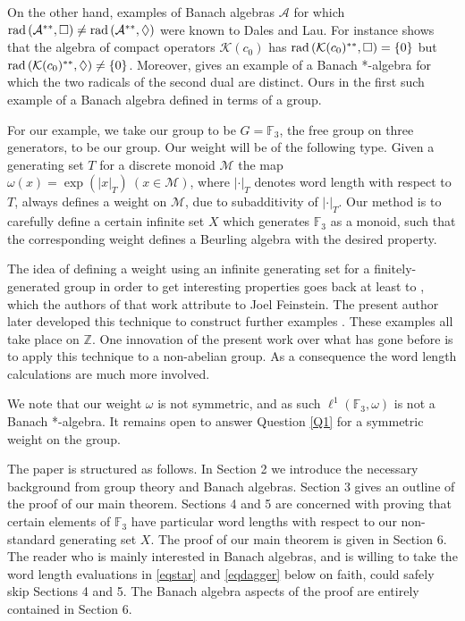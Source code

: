 \documentclass[twoside,11pt]{amsart}
\numberwithin{equation}{section}
\theoremstyle{definition}
\newcommand {\Z}{\mathbb Z}
\newcommand {\K}{\mathcal K}
\newcommand {\A}{\mathcal A}
\newcommand{\rad}{{\rm rad\,}}
\newcommand{\1}{\mathbbm{1}}
\newcommand{\F}{\mathbb F}
\begin{document}
	On the other hand, examples of Banach algebras $\A$ for which $\rad(\A^{**}, \Box) \neq \rad(\A^{**}, \Diamond)$ were known to Dales and Lau. For instance \cite[Example 6.2]{DL} shows that the algebra of compact operators $\K(c_0)$ has $\rad(\K(c_0)^{**}, \Box) = \{0 \}$ but $\rad(\K(c_0)^{**}, \Diamond) \neq \{ 0 \}$. Moreover, \cite[Example 6.3]{DL} gives an example of a Banach *-algebra for which the two radicals of the second dual are distinct. Ours in the first such example of a Banach algebra defined in terms of a group.	
	
	For our example, we take our group to be $G = \F_3$, the free group on three generators, to be our group. Our weight will be of the following type. Given a generating set $T$ for a discrete monoid $\mathcal{M}$ the map $\omega(x) = \exp(|x|_T) \ ( x \in \mathcal{M})$, where $|\cdot |_T$ denotes word length with respect to $T$, always defines a weight on $\mathcal{M}$, due to subadditivity of $| \cdot |_T$. Our method is to carefully define a certain infinite set $X$ which generates $\F_3$ as a monoid, such that the corresponding weight defines a Beurling algebra with the desired property. 
		
	The idea of defining a weight using an infinite generating set for a finitely-generated group in order to get interesting properties goes back at least to \cite[Example 9.17]{DL}, which the authors of that work attribute to Joel Feinstein. The present author later developed this technique to construct further examples \cite{W0, W2}. These examples all take place on $\Z$. One innovation of the present work over what has gone before is to apply this technique to a non-abelian group. As a consequence the word length calculations are much more involved. 
	
	We note that our weight $\omega$ is not symmetric, and as such $\ell^1(\F_3, \omega)$ is not a Banach *-algebra. It remains open to answer Question \ref{Q1} for a symmetric weight on the group.
	
	The paper is structured as follows. In Section 2 we introduce the necessary background from group theory and Banach algebras. Section 3 gives an outline of the proof of our main theorem. Sections 4 and 5 are concerned with proving that certain elements of $\F_3$ have particular word lengths with respect to our non-standard generating set $X$. The proof of our main theorem is given in Section 6. The reader who is mainly interested in Banach algebras, and is willing to take the word length evaluations in \eqref{eqstar} and \eqref{eqdagger} below on faith, could safely skip Sections 4 and 5. The Banach algebra aspects of the proof are entirely contained in Section 6.
	
\end{document}
